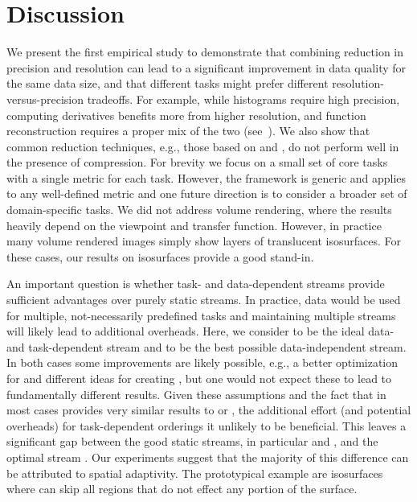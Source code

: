 \section{Discussion}

We present the first empirical study to demonstrate that combining reduction in precision and
resolution can lead to a significant improvement in data quality for the same data size, and that
different tasks might prefer different resolution-versus-precision tradeoffs. For example, while
histograms require high precision, computing derivatives benefits more from higher resolution, and
function reconstruction requires a proper mix of the two (see~). We also show
that common reduction techniques, e.g., those based on \slvl and \smag, do not perform well in the
presence of compression. For brevity we focus on a small set of core tasks with a single metric for
each task. However, the framework is generic and applies to any well-defined metric and one future
direction is to consider a broader set of domain-specific tasks. We did not address volume
rendering, where the results heavily depend on the viewpoint and transfer function. However,
in practice many volume rendered images simply show layers of
translucent isosurfaces. For these cases, our results on isosurfaces provide a good stand-in.

An important question is whether task- and data-dependent streams provide sufficient advantages over
purely static streams. In practice, data would be used for multiple, not-necessarily predefined tasks
and maintaining multiple streams will likely lead to additional overheads. Here, we consider \sopt
to be the ideal data- and task-dependent stream and \ssig to be the best possible data-independent
stream. In both cases some improvements are likely possible, e.g., a better optimization for \sopt
and different ideas for creating \ssig, but one would not expect these to lead to fundamentally
different results. Given these assumptions and the fact that \ssig in most cases provides very
similar results to \sbit or \swav, the additional effort (and potential overheads) for
task-dependent orderings it unlikely to be beneficial. This leaves a significant gap between the
good static streams, in particular \swav and \sbit, and the optimal stream \sopt. Our experiments
suggest that the majority of this difference can be attributed to spatial adaptivity. The
prototypical example are isosurfaces where \sopt can skip all regions that do not effect any
portion of the surface.

